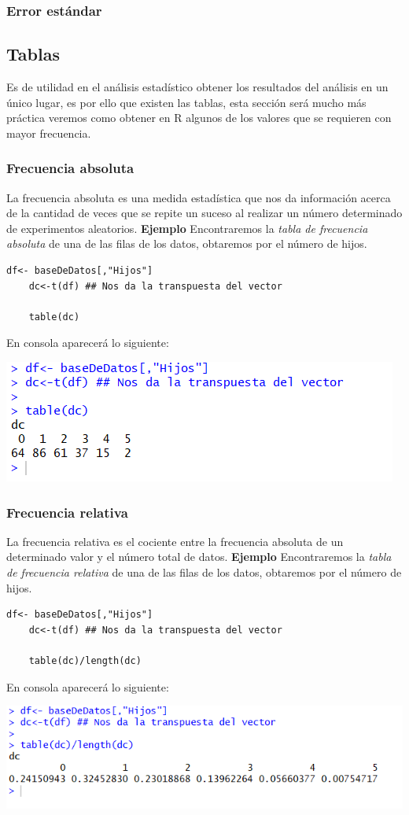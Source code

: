 \documentclass[12pt,hidelinks]{article}
\begin{document}
	\subsubsection{Error estándar}
	
	\subsection{Tablas}
	Es de utilidad en el análisis estadístico obtener los resultados del análisis en un único lugar, es por ello que existen las tablas, esta sección será mucho más práctica veremos como obtener en R algunos de los valores que se requieren con mayor frecuencia.
	\subsubsection{Frecuencia absoluta}
	La frecuencia absoluta es una medida estadística que nos da información acerca de la cantidad de veces que se repite un suceso al realizar un número determinado de experimentos aleatorios. \textbf{Ejemplo} Encontraremos la \textit{tabla de frecuencia absoluta} de una de las filas de los datos, obtaremos por el número de hijos.
	\begin{lstlisting}[frame=single]
	df<- baseDeDatos[,"Hijos"]
	dc<-t(df) ## Nos da la transpuesta del vector
	
	table(dc)
	\end{lstlisting}
	En consola aparecerá lo siguiente:
	\begin{center}
		\includegraphics[width = \linewidth]{TFabsoluta.PNG}
	\end{center}
	\subsubsection{Frecuencia relativa}
	La frecuencia relativa es el cociente entre la frecuencia absoluta de un determinado valor y el número total de datos. \textbf{Ejemplo} Encontraremos la \textit{tabla de frecuencia relativa} de una de las filas de los datos, obtaremos por el número de hijos.
	\begin{lstlisting}[frame=single]
	df<- baseDeDatos[,"Hijos"]
	dc<-t(df) ## Nos da la transpuesta del vector
	
	table(dc)/length(dc)
	\end{lstlisting}
	En consola aparecerá lo siguiente:
	\begin{center}
		\includegraphics[width=\linewidth]{TFrelativa.PNG}
	\end{center}
\end{document}
